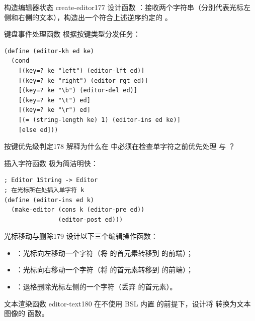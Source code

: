 \begin{exercise}{构造编辑器状态 create-editor}{177}
设计函数 ：接收两个字符串（分别代表光标左侧和右侧的文本），构造出一个符合上述逆序约定的 。
\end{exercise}

键盘事件处理函数  根据按键类型分发任务：
\begin{lstlisting}[language=BSL]
(define (editor-kh ed ke)
  (cond
    [(key=? ke "left") (editor-lft ed)]
    [(key=? ke "right") (editor-rgt ed)]
    [(key=? ke "\b") (editor-del ed)]
    [(key=? ke "\t") ed]
    [(key=? ke "\r") ed]
    [(= (string-length ke) 1) (editor-ins ed ke)]
    [else ed]))
\end{lstlisting}

\begin{exercise}{按键优先级判定}{178}
解释为什么在  中必须在检查单字符之前优先处理  与 ？
\end{exercise}

插入字符函数  极为简洁明快：
\begin{lstlisting}[language=BSL]
; Editor 1String -> Editor
; 在光标所在处插入单字符 k
(define (editor-ins ed k)
  (make-editor (cons k (editor-pre ed))
               (editor-post ed)))
\end{lstlisting}

\begin{exercise}{光标移动与删除}{179}
设计以下三个编辑操作函数：
\begin{itemize}
  \item {}：光标向左移动一个字符（将  的首元素转移到  的前端）；
  \item {}：光标向右移动一个字符（将  的首元素转移到  的前端）；
  \item {}：退格删除光标左侧的一个字符（丢弃  的首元素）。
\end{itemize}
\end{exercise}

\begin{exercise}{文本渲染函数 editor-text}{180}
在不使用 BSL 内置  的前提下，设计将  转换为文本图像的  函数。
\end{exercise}
